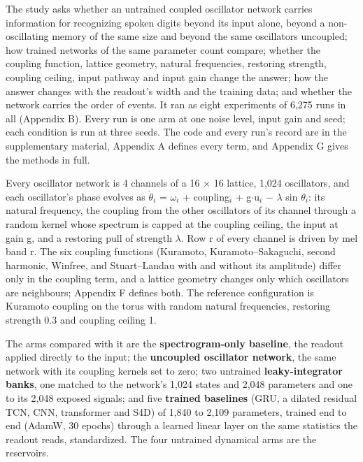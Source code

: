 \documentclass[10pt]{article}
\begin{document}
The study asks whether an untrained coupled oscillator network carries
information for recognizing spoken digits beyond its input alone, beyond
a non-oscillating memory of the same size and beyond the same
oscillators uncoupled; how trained networks of the same parameter count
compare; whether the coupling function, lattice geometry, natural
frequencies, restoring strength, coupling ceiling, input pathway and
input gain change the answer; how the answer changes with the readout's
width and the training data; and whether the network carries the order
of events. It ran as eight experiments of 6,275 runs in all (Appendix
B). Every run is one arm at one noise level, input gain and seed; each
condition is run at three seeds. The code and every run's record are in
the supplementary material, Appendix A defines every term, and Appendix
G gives the methods in full.

Every oscillator network is 4 channels of a 16 \ensuremath{\times} 16
lattice, 1,024 oscillators, and each oscillator's phase evolves as
\ensuremath{\dot{\theta}_{i}} = \ensuremath{\omega_{i}} +
coupling\ensuremath{_{i}} + g\ensuremath{\cdot}u\ensuremath{_{i}}
\ensuremath{-} \ensuremath{\lambda} sin \ensuremath{\theta_{i}}: its
natural frequency, the coupling from the other oscillators of its
channel through a random kernel whose spectrum is capped at the coupling
ceiling, the input at gain g, and a restoring pull of strength
\ensuremath{\lambda}. Row r of every channel is driven by mel band r.
The six coupling functions (Kuramoto, Kuramoto--Sakaguchi, second
harmonic, Winfree, and Stuart--Landau with and without its amplitude)
differ only in the coupling term, and a lattice geometry changes only
which oscillators are neighbours; Appendix F defines both. The reference
configuration is Kuramoto coupling on the torus with random natural
frequencies, restoring strength 0.3 and coupling ceiling 1.

The arms compared with it are the \textbf{spectrogram-only baseline},
the readout applied directly to the input; the \textbf{uncoupled
oscillator network}, the same network with its coupling kernels set to
zero; two untrained \textbf{leaky-integrator banks}, one matched to the
network's 1,024 states and 2,048 parameters and one to its 2,048 exposed
signals; and five \textbf{trained baselines} (GRU, a dilated residual
TCN, CNN, transformer and S4D) of 1,840 to 2,109 parameters, trained end
to end (AdamW, 30 epochs) through a learned linear layer on the same
statistics the readout reads, standardized. The four untrained dynamical
arms are the reservoirs.
\end{document}
